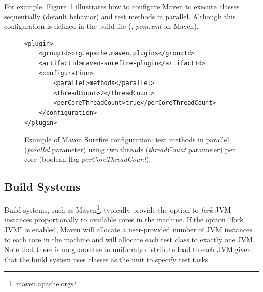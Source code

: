  For example, Figure~\ref{fig:surefire} illustrates how to
configure Maven to execute classes sequentially (default behavior) and
test methods in parallel. Although this configuration is defined in
the build file (\eg, \emph{pom.xml} on Maven), 

\begin{figure}[h!]
\centering
\scriptsize
{}
\begin{lstlisting}
<plugin>
    <groupId>org.apache.maven.plugins</groupId>
    <artifactId>maven-surefire-plugin</artifactId>
    <configuration>
        <parallel>methods</parallel>
        <threadCount>2</threadCount>
        <perCoreThreadCount>true</perCoreThreadCount>
    </configuration>
</plugin>
\end{lstlisting}
\caption{\label{fig:surefire} Example of Maven Surefire configuration:
    test methods in parallel (\emph{parallel} parameter) using two
    threads (\emph{threadCount} parameter) per core (boolean flag
    \emph{perCoreThreadCount}).}
\end{figure}


\subsection{Build Systems}
Build systems, such as Maven\footnote{\url{maven.apache.org}},
typically provide the option to \emph{fork} JVM instances
proportionally to available cores in the machine.  If the option
``fork JVM'' is enabled, Maven will allocate a user-provided number of
JVM instances to each core in the machine and will allocate each test
class to exactly one JVM.  Note that there is no guarantee to
uniformly distribute load to each JVM given that the build system uses
classes as the unit to specify test tasks.
